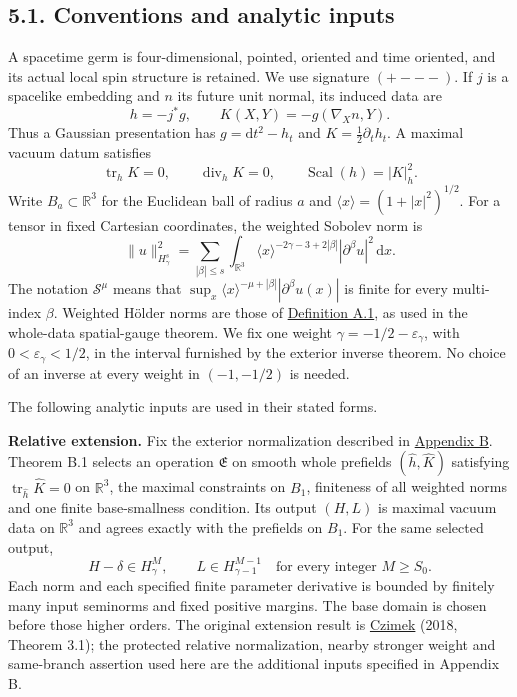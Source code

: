 \documentclass[
  english,
  11pt,
  reqno]{amsart}
\makeatletter
\newcommand{\paperleadspace}{%
  \par\if@nobreak\else
    \addpenalty{\@secpenalty}\addvspace{.5\baselineskip}%
  \fi}
\newcommand{\paperleadin}[1]{%
  \ifvmode\paperleadspace\fi
  \textbf{#1}}
\makeatother
\begin{document}
\subsection{5.1. Conventions and analytic
inputs}\label{conventions-and-analytic-inputs}\label{sec:submission-coverage-conventions}

A spacetime germ is four-dimensional, pointed, oriented and time
oriented, and its actual local spin structure is retained. We use
signature \((+---)\). If \(j\) is a spacelike embedding and \(n\) its
future unit normal, its induced data are%
 \[
h=-j^*g,
\qquad
K(X,Y)=-g(\nabla_Xn,Y).
\] Thus a Gaussian presentation has \(g=\mathrm dt^2-h_t\) and
\(K=\tfrac12\partial_t h_t\). A maximal vacuum datum satisfies%
 \[
\operatorname{tr}_hK=0,
\qquad
\operatorname{div}_hK=0,
\qquad
\operatorname{Scal}(h)=|K|_h^2.
\] Write \(B_a\subset\mathbb R^3\) for the Euclidean ball of radius
\(a\) and \(\langle x\rangle=(1+|x|^2)^{1/2}\). For a tensor in fixed
Cartesian coordinates, the weighted Sobolev norm is%
 \[
\|u\|_{H^s_\gamma}^2
=
\sum_{|\beta|\le s}
\int_{\mathbb R^3}
\langle x\rangle^{-2\gamma-3+2|\beta|}
|\partial^\beta u|^2\,\mathrm dx.
\] The notation \(\mathscr S^\mu\) means that
\(\sup_x\langle x\rangle^{-\mu+|\beta|}|\partial^\beta u(x)|\) is finite
for every multi-index \(\beta\). Weighted Hölder norms are those of
\hyperref[def:online-weighted-holder-chart-spaces]{Definition A.1}, as
used in the whole-data spatial-gauge theorem. We fix one weight
\(\gamma=-1/2-\varepsilon_\gamma\), with \(0<\varepsilon_\gamma<1/2\),
in the interval furnished by the exterior inverse theorem. No choice of
an inverse at every weight in \((-1,-1/2)\) is needed.

The following analytic inputs are used in their stated forms.

\paperleadin{Relative extension.} Fix the exterior normalization described in
\hyperref[app:online-relative-extension]{Appendix B}. Theorem B.1
selects an operation \(\mathfrak E\) on smooth whole prefields
\((\widehat h,\widehat K)\) satisfying
\(\operatorname{tr}_{\widehat h}\widehat K=0\) on \(\mathbb R^3\), the
maximal constraints on \(B_1\), finiteness of all weighted norms and one
finite base-smallness condition. Its output \((H,L)\) is maximal vacuum
data on \(\mathbb R^3\) and agrees exactly with the prefields on
\(B_1\). For the same selected output,%
 \[
H-\delta\in H^M_\gamma,\qquad
L\in H^{M-1}_{\gamma-1}
\quad\text{for every integer }M\ge S_0.
\] Each norm and each specified finite parameter derivative is bounded
by finitely many input seminorms and fixed positive margins. The base
domain is chosen before those higher orders. The original extension
result is \hyperref[ref-Czimek2018]{Czimek} (2018, Theorem 3.1); the
protected relative normalization, nearby stronger weight and same-branch
assertion used here are the additional inputs specified in Appendix B.
\end{document}
